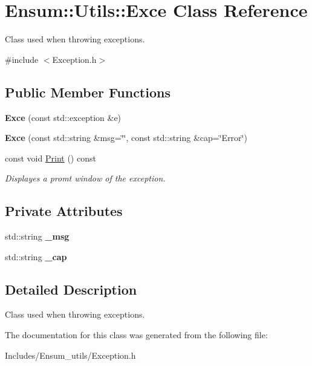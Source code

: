 \hypertarget{class_ensum_1_1_utils_1_1_exce}{}\section{Ensum\+:\+:Utils\+:\+:Exce Class Reference}
\label{class_ensum_1_1_utils_1_1_exce}


Class used when throwing exceptions.  




{\ttfamily \#include $<$Exception.\+h$>$}

\subsection*{Public Member Functions}
\begin{DoxyCompactItemize}
\item 
{\bfseries Exce} (const std\+::exception \&e)\hypertarget{class_ensum_1_1_utils_1_1_exce_ae42fe392fd3dd2c5f96b29dfd75891d7}{}\label{class_ensum_1_1_utils_1_1_exce_ae42fe392fd3dd2c5f96b29dfd75891d7}

\item 
{\bfseries Exce} (const std\+::string \&msg=\char`\"{}\char`\"{}, const std\+::string \&cap=\char`\"{}Error\char`\"{})\hypertarget{class_ensum_1_1_utils_1_1_exce_a56d6c9a95abf1a5aac926fd54f064b38}{}\label{class_ensum_1_1_utils_1_1_exce_a56d6c9a95abf1a5aac926fd54f064b38}

\item 
const void \hyperlink{class_ensum_1_1_utils_1_1_exce_a2a47fd993b3df2ac504efdde1d27b0ab}{Print} () const \hypertarget{class_ensum_1_1_utils_1_1_exce_a2a47fd993b3df2ac504efdde1d27b0ab}{}\label{class_ensum_1_1_utils_1_1_exce_a2a47fd993b3df2ac504efdde1d27b0ab}

\begin{DoxyCompactList}\small\item\em Displayes a promt window of the exception. \end{DoxyCompactList}\end{DoxyCompactItemize}
\subsection*{Private Attributes}
\begin{DoxyCompactItemize}
\item 
std\+::string {\bfseries \+\_\+msg}\hypertarget{class_ensum_1_1_utils_1_1_exce_a1cbeb41b655ef7b75db5f9debd900479}{}\label{class_ensum_1_1_utils_1_1_exce_a1cbeb41b655ef7b75db5f9debd900479}

\item 
std\+::string {\bfseries \+\_\+cap}\hypertarget{class_ensum_1_1_utils_1_1_exce_a902d6a841c38e37f70c75a175d6395a7}{}\label{class_ensum_1_1_utils_1_1_exce_a902d6a841c38e37f70c75a175d6395a7}

\end{DoxyCompactItemize}


\subsection{Detailed Description}
Class used when throwing exceptions. 

The documentation for this class was generated from the following file\+:\begin{DoxyCompactItemize}
\item 
Includes/\+Ensum\+\_\+utils/Exception.\+h\end{DoxyCompactItemize}
